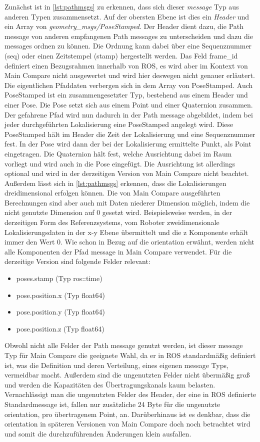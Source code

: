 Zunächst ist in \autoref{lst:pathmsgs} zu erkennen, dass sich dieser \textit{message} Typ aus anderen Typen
zusammensetzt. Auf der obersten Ebene ist dies ein
\textit{Header} und ein Array von \textit{geometry\_msgs/PoseStamped}.
Der Header dient dazu, die Path message von anderen empfangenen
Path messages zu unterscheiden und dazu die messages ordnen zu können. Die Ordnung kann dabei über eine Sequenznummer
(seq) oder einen Zeitstempel (stamp) hergestellt werden. Das Feld frame\_id
definiert einen Bezugsrahmen innerhalb von ROS, es wird aber im Kontext von
Main Compare nicht ausgewertet und wird hier deswegen nicht genauer erläutert.
Die eigentlichen Pfaddaten verbergen sich in dem Array von PoseStamped. Auch
PoseStamped ist ein zusammengesetzter Typ, bestehend aus einem Header und einer
Pose. Die Pose setzt sich aus einem Point und einer Quaternion zusammen.
Der gefahrene Pfad wird nun dadurch in der Path message abgebildet, indem bei
jeder durchgeführten Lokalisierung eine PoseStamped angelegt wird. Diese PoseStamped
hält im Header die Zeit der Lokalisierung und eine Sequenznummer fest. In der
Pose wird dann der bei der Lokalisierung ermittelte Punkt, als Point eingetragen. Die Quaternion
hält fest, welche Ausrichtung dabei im Raum vorliegt und wird auch
in die Pose eingefügt. Die Ausrichtung ist
allerdings optional und wird in der derzeitigen Version von Main Compare nicht beachtet. 
Außerdem lässt sich in \autoref{lst:pathmsgs} erkennen, dass die
Lokalisierungen dreidimensional erfolgen können. Die von Main Compare
ausgeführten Berechnungen sind aber auch mit Daten niederer Dimension möglich,
indem die nicht genutzte Dimension auf 0 gesetzt wird. Beispielsweise werden,
in der derzeitigen Form des Referenzsystems, vom Roboter zweidimensionale
Lokalisierungsdaten in der x-y Ebene übermittelt und die z Komponente erhält
immer den Wert 0. Wie schon in Bezug auf die orientation erwähnt, werden nicht alle Komponenten der
Pfad message in Main Compare verwendet. Für die derzeitige Version sind
folgende Felder relevant:

\begin{itemize}
  \item poses.stamp (Typ ros::time)
  \item pose.position.x (Typ float64)
  \item pose.position.y (Typ float64)
  \item pose.position.z (Typ float64)
\end{itemize}

Obwohl nicht alle Felder der Path message genutzt werden, ist dieser message Typ
für Main Compare die geeignete Wahl, da er in ROS standardmäßig
definiert ist, was die Definition und deren Verteilung, eines
eigenen message Typs, vermeidbar macht. Außerdem sind die ungenutzten Felder nicht
übermäßig groß und werden die Kapazitäten des Übertragungskanals kaum belasten.
Vernachlässigt man die ungenutzten Felder des Header, der eine in ROS definierte Standardmessage ist, fallen nur
zusätzliche 24 Byte für die ungenutzte orientation, pro übertragenem Point, an.
Darüberhinaus ist es denkbar, dass die orientation in späteren Versionen von
Main Compare doch noch betrachtet wird und somit die durchzuführenden
Änderungen klein ausfallen.

